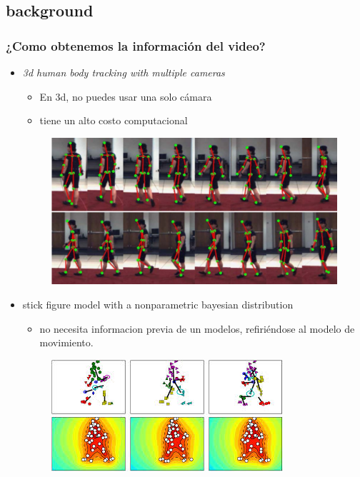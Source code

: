 \documentclass{beamer}
\begin{document}
\subsection{background}
\begin{frame}
\frametitle{¿Como obtenemos la información del video?}
 
\begin{itemize}
\item \textit{3d human body tracking with multiple cameras}
    \begin{itemize}
    \item En 3d, no puedes usar una solo cámara
     \item tiene un alto costo computacional
    \end{itemize}	
    \begin{figure}
    \includegraphics[width=0.4\linewidth]{img2/Selection_022.png} 
    \end{figure}
    
\item stick figure model with a nonparametric bayesian distribution
    \begin{itemize}
    \item no necesita informacion previa de un modelos, refiriéndose al modelo de movimiento.
    \end{itemize}

     \begin{figure}
     \includegraphics[width=0.4\linewidth]{img2/images.jpg} 
    \end{figure}

 \end{itemize}
\end{frame}
 


 
 
\end{document}

